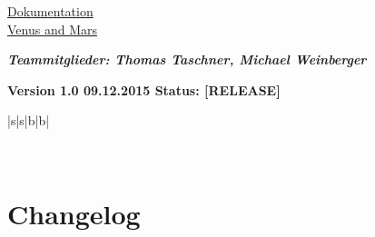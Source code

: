 \documentclass[12pt,a4paper,oneside,ngerman]{scrartcl}
\begin{document}
\thispagestyle{empty}
\vspace*{2cm}


\begin{center}
\begin{huge}
\renewcommand{\ULthickness}{2pt}
\uline{Dokumentation}
\\
\uline{Venus and Mars}
\end{huge}
\end{center}

\vspace{9cm}

\textit{\textbf{Teammitglieder: Thomas Taschner, Michael Weinberger}}
\vspace{10mm}

\textbf{{\color{g4}Version 1.0 \hfill 09.12.2015 \hfill Status: [RELEASE]}}
\\
\begin{table}[h]
\renewcommand{\arraystretch}{3.0}
\centering
\begin{tabularx}{\textwidth}{|s|s|b|b|}

\specialrule{0.07em}{0em}{0em}
 \\ \hline
\end{tabularx}
\end{table}
\newpage


\pagestyle{fancy}
\renewcommand{\headrulewidth}{0.4pt}
\renewcommand{\footrulewidth}{0.4pt}
\setlength\headheight{15pt}
\cfoot{}


\tableofcontents\thispagestyle{fancy}
\newpage


\section{Changelog}
\end{document}
